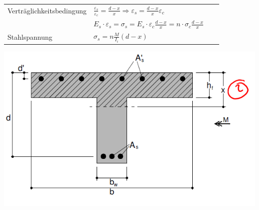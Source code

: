 \begin{landscape}
\begin{multicols}{3}
\begin{tabular}{p{0.4\linewidth}|p{0.6\linewidth}}
			\hspace*{0pt} Verträglichkeitsbedingung & $ \frac{\varepsilon_s}{\varepsilon_c} = \frac{d - x}{x}
			\Rightarrow \varepsilon_s = \frac{d - x}{x} \varepsilon_c $	 \\
			& $ E_s \cdot \varepsilon_s = \sigma_s = E_s \cdot \varepsilon_c \frac{d - x}{x} = n \cdot \sigma_c \frac{d - x}{x} $		\\
			
			Stahlspannung			& $ \sigma_s = n \frac{M}{I_i} (d - x) $ \\
			
		\end{tabular}
		
		
		\includegraphics[width=0.5\linewidth]{images/Risse4Plattenbalken.PNG}
		
		
	\end{multicols}
	
\end{landscape}



